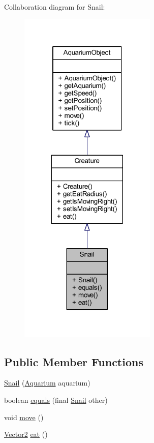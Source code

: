 Collaboration diagram for Snail\+:
\nopagebreak
\begin{figure}[H]
\begin{center}
\leavevmode
\includegraphics[width=185pt]{class_snail__coll__graph}
\end{center}
\end{figure}
\subsection*{Public Member Functions}
\begin{DoxyCompactItemize}
\item 
\mbox{\hyperlink{class_snail_a3d4915693af6b0c199630e178779e9c7}{Snail}} (\mbox{\hyperlink{class_aquarium}{Aquarium}} aquarium)
\item 
boolean \mbox{\hyperlink{class_snail_a7522b5e50a9d20f2e5277776436a70af}{equals}} (final \mbox{\hyperlink{class_snail}{Snail}} other)
\item 
void \mbox{\hyperlink{class_snail_ad7f5483ed4eb1202d1d61d741a1f4236}{move}} ()
\item 
\mbox{\hyperlink{class_vector2}{Vector2}} \mbox{\hyperlink{class_snail_a91bfc5472b84f59116413ff211ffd477}{eat}} ()
\end{DoxyCompactItemize}


